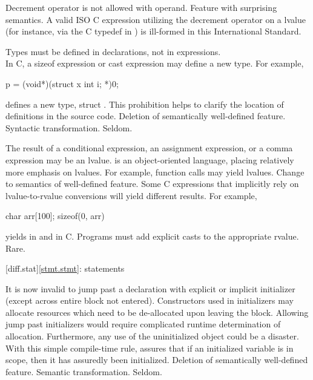 \change
Decrement operator is not allowed with  operand.
\rationale
Feature with surprising semantics.
\effect
A valid ISO C expression utilizing the decrement operator on
a  lvalue (for instance, via the C typedef in )
is ill-formed in this International Standard.

\change
Types must be defined in declarations, not in expressions.\\
In C, a sizeof expression or cast expression may define a new type.
For example,
\begin{codeblock}
p = (void*)(struct x {int i;} *)0;
\end{codeblock}
defines a new type, struct .
\rationale
This prohibition helps to clarify the location of
definitions in the source code.
\effect
Deletion of semantically well-defined feature.
\difficulty
Syntactic transformation.
\howwide
Seldom.

%
%
%
\change
The result of a conditional expression, an assignment expression, or a comma expression may be an lvalue.
\rationale
\Cpp{} is an object-oriented language, placing relatively
more emphasis on lvalues.  For example, function calls may
yield lvalues.
\effect
Change to semantics of well-defined feature.  Some C
expressions that implicitly rely on lvalue-to-rvalue
conversions will yield different results.  For example,

\begin{codeblock}
char arr[100];
sizeof(0, arr)
\end{codeblock}

yields
in \Cpp{} and
in C.
\difficulty
Programs must add explicit casts to the appropriate rvalue.
\howwide
Rare.

[diff.stat]{\ref{stmt.stmt}: statements}

\change
It is now invalid to jump past a declaration with explicit or implicit initializer (except across entire block not entered).
\rationale
Constructors used in initializers may allocate
resources which need to be de-allocated upon leaving the
block.
Allowing jump past initializers would require
complicated runtime determination of allocation.
Furthermore, any use of the uninitialized object could be a
disaster.
With this simple compile-time rule, \Cpp{} assures that
if an initialized variable is in scope, then it has assuredly been
initialized.
\effect
Deletion of semantically well-defined feature.
\difficulty
Semantic transformation.
\howwide
Seldom.

